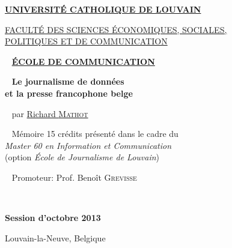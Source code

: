 
\begin{center}

\Large \href{http://www.uclouvain.be/}{\textbf{UNIVERSITÉ CATHOLIQUE DE LOUVAIN}}

\large \href{http://www.uclouvain.be/espo}{FACULTÉ DES SCIENCES ÉCONOMIQUES, SOCIALES, \\
POLITIQUES ET DE COMMUNICATION}

~ \vfill
\large \href{http://www.uclouvain.be/comu}{\textbf{ÉCOLE DE COMMUNICATION}}

~ \vfill
\huge\textbf{Le journalisme de données \\et la presse francophone belge}

~ \vfill
\large par \href{mailto:richard.mathot@gmail.com}{Richard \textsc{Mathot}}

~ \vfill
\normalsize Mémoire 15 crédits présenté dans le cadre du \\
\emph{Master 60 en Information et Communication}\\
(option \emph{École de Journalisme de Louvain})

\end{center}


~ \vfill
\hspace{6cm} Promoteur: Prof. Benoît \textsc{Grevisse}



~ \vfill

\begin{center}
\normalsize \textbf{Session d'octobre 2013}

Louvain-la-Neuve, Belgique
\end{center}

\thispagestyle{empty}

